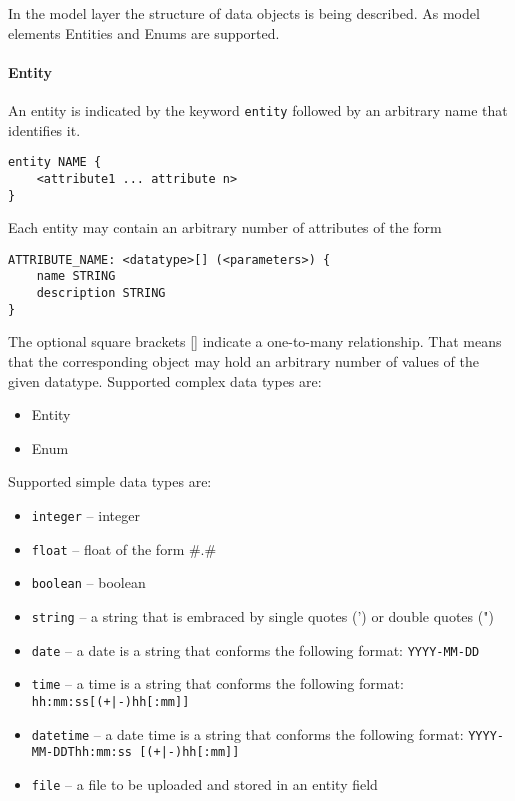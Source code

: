 
In the model layer the structure of data objects is being described. As model elements Entities and Enums are supported.
\paragraph{Entity}
An entity is indicated by the keyword {\lstinline!entity!} followed by an arbitrary name that identifies it.
\begin{lstlisting}
entity NAME {
	<attribute1 ... attribute n>
}
\end{lstlisting}
Each entity may contain an arbitrary number of attributes of the form
\begin{lstlisting}
ATTRIBUTE_NAME: <datatype>[] (<parameters>) {
	name STRING
	description STRING
}
\end{lstlisting}
The optional square brackets [] indicate a one-to-many relationship. That means that the corresponding object may hold an arbitrary number of values of the given datatype.
Supported complex data types are:
\begin{itemize}
\item{Entity}
\item{Enum}
\end{itemize}
Supported simple data types are:

\begin{itemize}
\item{\lstinline!integer! -- integer}
\item{\lstinline!float! -- float of the form \#.\#}
\item{\lstinline!boolean! -- boolean}
\item{\lstinline!string! -- a string that is embraced by single quotes (') or double quotes (")}
\item{\lstinline!date! -- a date is a string that conforms the following format: \lstinline!YYYY-MM-DD!}
\item{\lstinline!time! -- a time is a string that conforms the following format: \lstinline!hh:mm:ss[(+|-)hh[:mm]]!}
\item{\lstinline!datetime! -- a date time is a string that conforms the following format: \lstinline!YYYY-MM-DDThh:mm:ss [(+|-)hh[:mm]]!}
\item{\lstinline!file! -- a file to be uploaded and stored in an entity field}
\end{itemize}

